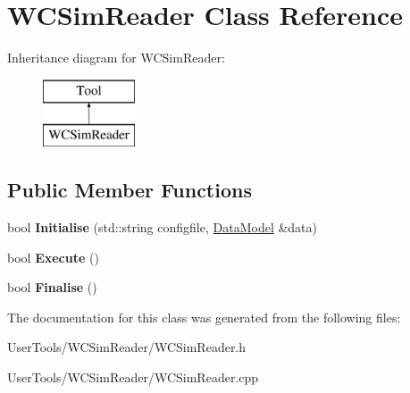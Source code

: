 \hypertarget{classWCSimReader}{\section{W\-C\-Sim\-Reader Class Reference}
\label{classWCSimReader}
}
Inheritance diagram for W\-C\-Sim\-Reader\-:\begin{figure}[H]
\begin{center}
\leavevmode
\includegraphics[height=2.000000cm]{classWCSimReader}
\end{center}
\end{figure}
\subsection*{Public Member Functions}
\begin{DoxyCompactItemize}
\item 
\hypertarget{classWCSimReader_a6b68e5354bd307f85345b776977943c9}{bool {\bfseries Initialise} (std\-::string configfile, \hyperlink{classDataModel}{Data\-Model} \&data)}\label{classWCSimReader_a6b68e5354bd307f85345b776977943c9}

\item 
\hypertarget{classWCSimReader_a846289c0eb870110a4961257832203c5}{bool {\bfseries Execute} ()}\label{classWCSimReader_a846289c0eb870110a4961257832203c5}

\item 
\hypertarget{classWCSimReader_a806d70ee9a5522b85feea663d34799ff}{bool {\bfseries Finalise} ()}\label{classWCSimReader_a806d70ee9a5522b85feea663d34799ff}

\end{DoxyCompactItemize}


The documentation for this class was generated from the following files\-:\begin{DoxyCompactItemize}
\item 
User\-Tools/\-W\-C\-Sim\-Reader/W\-C\-Sim\-Reader.\-h\item 
User\-Tools/\-W\-C\-Sim\-Reader/W\-C\-Sim\-Reader.\-cpp\end{DoxyCompactItemize}
